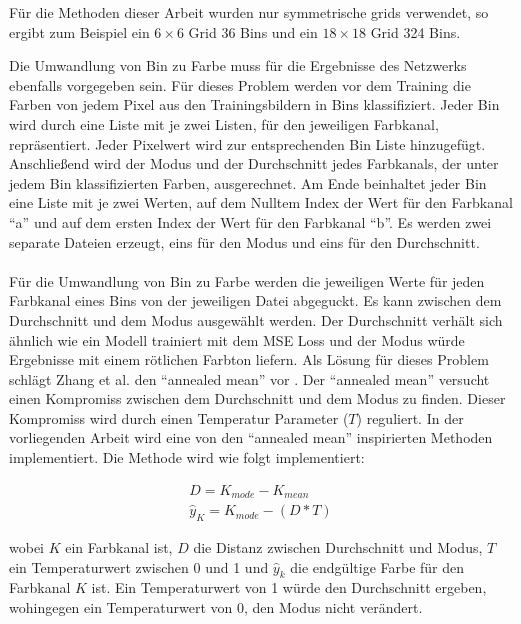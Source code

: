 Für die Methoden dieser Arbeit wurden nur symmetrische \gls{grid}s verwendet, so ergibt zum Beispiel ein $6 \times 6$ Grid 36 Bins und 
ein $18 \times 18$ Grid 324 Bins.

Die Umwandlung von Bin zu Farbe muss für die Ergebnisse des Netzwerks ebenfalls vorgegeben sein. Für dieses Problem werden vor dem 
Training die Farben von jedem Pixel aus den Trainingsbildern in Bins klassifiziert. Jeder Bin wird durch eine Liste mit je zwei Listen, 
für den jeweiligen Farbkanal, repräsentiert. Jeder Pixelwert wird zur entsprechenden Bin Liste hinzugefügt. Anschließend wird der Modus 
und der Durchschnitt jedes Farbkanals, der unter jedem Bin klassifizierten Farben, ausgerechnet. Am Ende beinhaltet jeder Bin eine Liste mit je zwei
Werten, auf dem Nulltem Index der Wert für den Farbkanal ``a'' und auf dem ersten Index der Wert für den Farbkanal ``b''. Es werden zwei separate
Dateien erzeugt, eins für den Modus und eins für den Durchschnitt.
\\
\\
Für die Umwandlung von Bin zu Farbe werden die jeweiligen Werte für jeden Farbkanal eines Bins von der jeweiligen Datei abgeguckt. Es kann zwischen
dem Durchschnitt und dem Modus ausgewählt werden. Der Durchschnitt verhält sich ähnlich wie ein Modell trainiert mit dem MSE Loss und der Modus
würde Ergebnisse mit einem rötlichen Farbton liefern. Als Lösung für dieses Problem schlägt Zhang et al. den ``annealed mean'' vor \cite{zhang2016colorful}.
Der ``annealed mean'' versucht einen Kompromiss zwischen dem Durchschnitt und dem Modus zu finden. Dieser Kompromiss wird durch einen 
Temperatur Parameter ($T$) reguliert. In der vorliegenden Arbeit wird eine von den ``annealed mean'' inspirierten Methoden implementiert. 
Die Methode wird wie folgt implementiert:

\begin{equation}
  \begin{gathered}
    D = K_{mode} - K_{mean} \\
    \hat{y}_{K} = K_{mode} - (D * T)
  \end{gathered}
\end{equation}

wobei $K$ ein Farbkanal ist, $D$ die Distanz zwischen Durchschnitt und Modus, $T$ ein Temperaturwert zwischen 0 und 1 und $\hat{y}_{k}$ die
endgültige Farbe für den Farbkanal $K$ ist.
Ein Temperaturwert von 1 würde den Durchschnitt ergeben, wohingegen ein Temperaturwert von 0, den Modus nicht verändert.


